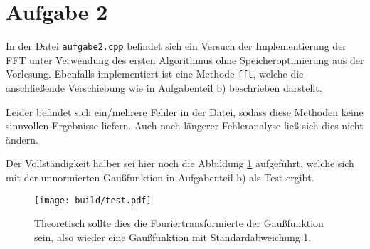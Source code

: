 \section*{Aufgabe 2}

In der Datei \texttt{aufgabe2.cpp} befindet sich ein Versuch der Implementierung der FFT
unter Verwendung des ersten Algorithmus ohne Speicheroptimierung aus der Vorlesung.
Ebenfalls implementiert ist eine Methode \texttt{fft}, welche die anschließende
Verschiebung wie in Aufgabenteil b) beschrieben darstellt.

Leider befindet sich ein/mehrere Fehler in der Datei, sodass diese Methoden keine
sinnvollen Ergebnisse liefern. Auch nach längerer Fehleranalyse ließ sich dies nicht
ändern.

Der Vollständigkeit halber sei hier noch die Abbildung \ref{fig:test} aufgeführt,
welche sich mit der unnormierten Gaußfunktion in Aufgabenteil b) als Test ergibt.

\begin{figure}
  \centering
  \texttt{[image: build/test.pdf]}
  \caption{Theoretisch sollte dies die Fouriertransformierte der Gaußfunktion
  sein, also wieder eine Gaußfunktion mit Standardabweichung \num{1}.}
  \label{fig:test}
\end{figure}
